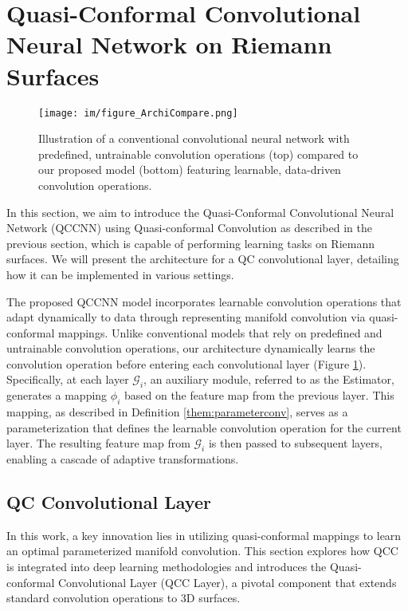 \section{Quasi-Conformal Convolutional Neural Network on Riemann Surfaces}

\begin{figure}
    \centering
    \texttt{[image: im/figure\_ArchiCompare.png]}
    \caption{Illustration of a conventional convolutional neural network with predefined, untrainable convolution operations (top) compared to our proposed model (bottom) featuring learnable, data-driven convolution operations.}
    \label{fig:archi-compare}
\end{figure}

In this section, we aim to introduce the Quasi-Conformal Convolutional Neural Network (QCCNN) using Quasi-conformal Convolution as described in the previous section, which is capable of performing learning tasks on Riemann surfaces. We will present the architecture for a QC convolutional layer, detailing how it can be implemented in various settings.

The proposed QCCNN model incorporates learnable convolution operations that adapt dynamically to data through representing manifold convolution via quasi-conformal mappings. Unlike conventional models that rely on predefined and untrainable convolution operations, our architecture dynamically learns the convolution operation before entering each convolutional layer (Figure \ref{fig:archi-compare}). Specifically, at each layer $\mathcal{G}_i$, an auxiliary module, referred to as the Estimator, generates a mapping $\phi_i$ based on the feature map from the previous layer. This mapping, as described in Definition \ref{them:parameterconv}, serves as a parameterization that defines the learnable convolution operation for the current layer. The resulting feature map from $\mathcal{G}_i$ is then passed to subsequent layers, enabling a cascade of adaptive transformations.

\subsection{QC Convolutional Layer}

In this work, a key innovation lies in utilizing quasi-conformal mappings to learn an optimal parameterized manifold convolution. This section explores how QCC is integrated into deep learning methodologies and introduces the Quasi-conformal Convolutional Layer (QCC Layer), a pivotal component that extends standard convolution operations to 3D surfaces.

